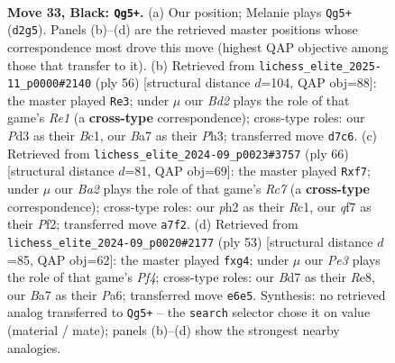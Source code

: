 \documentclass[11pt]{article}
\begin{document}
\clearpage

\begin{figure}[p]\centering
\begin{subfigure}{0.46\textwidth}\centering
\resizebox{\linewidth}{!}{%
\newchessgame
\chessboard[
  setfen={r2r3k/bp1b1Qp1/p3p2P/8/8/BP1p3B/P2q1PKP/1R2R3 b - - 0 33},
  showmover=false,
  pgfstyle=straightmove, color=movearrow, markmove={d2-g5}
]}
\caption{}
\end{subfigure}\hfill
\begin{subfigure}{0.46\textwidth}\centering
\resizebox{\linewidth}{!}{%
\newchessgame
\chessboard[
  setfen={6rk/p5rp/2p4Q/2pp1R2/P3p1Pb/1P4qP/2P5/2B1RK2 w - - 4 29},
  showmover=false,
  pgfstyle=straightmove, color=movearrow, markmove={e1-e3}
]}
\caption{}
\end{subfigure}
\\[4pt]
\begin{subfigure}{0.46\textwidth}\centering
\resizebox{\linewidth}{!}{%
\newchessgame
\chessboard[
  setfen={3r1rk1/2R2p2/5Qpp/p4b2/1q1Pp3/1P5P/5PP1/1BR3K1 w - - 3 34},
  showmover=false,
  pgfstyle=straightmove, color=movearrow, markmove={c7-f7}
]}
\caption{}
\end{subfigure}\hfill
\begin{subfigure}{0.46\textwidth}\centering
\resizebox{\linewidth}{!}{%
\newchessgame
\chessboard[
  setfen={4rrk1/8/ppQ1p1Pp/4bp2/2P3P1/2qB4/P1P1KP2/3R3R b - - 0 27},
  showmover=false,
  pgfstyle=straightmove, color=movearrow, markmove={f5-g4}
]}
\caption{}
\end{subfigure}
\caption{\textbf{Move 33, Black: \texttt{Qg5+}.} (a) Our position; Melanie plays \texttt{Qg5+} (\texttt{d2g5}). Panels (b)--(d) are the retrieved master positions whose correspondence most drove this move (highest QAP objective among those that transfer to it). (b) Retrieved from \texttt{lichess\_elite\_2025-11\_p0000\#2140} (ply 56) [structural distance $d$=104, QAP obj=88]: the master played \texttt{Re3}; under $\mu$ our \emph{Bd2} plays the role of that game's \emph{Re1} (a \textbf{cross-type} correspondence); cross-type roles: our \emph{P}d3 as their \emph{B}c1, our \emph{B}a7 as their \emph{P}h3; transferred move \texttt{d7c6}. (c) Retrieved from \texttt{lichess\_elite\_2024-09\_p0023\#3757} (ply 66) [structural distance $d$=81, QAP obj=69]: the master played \texttt{Rxf7}; under $\mu$ our \emph{Ba2} plays the role of that game's \emph{Rc7} (a \textbf{cross-type} correspondence); cross-type roles: our \emph{p}h2 as their \emph{R}c1, our \emph{q}f7 as their \emph{P}f2; transferred move \texttt{a7f2}. (d) Retrieved from \texttt{lichess\_elite\_2024-09\_p0020\#2177} (ply 53) [structural distance $d$=85, QAP obj=62]: the master played \texttt{fxg4}; under $\mu$ our \emph{Pe3} plays the role of that game's \emph{Pf4}; cross-type roles: our \emph{B}d7 as their \emph{R}e8, our \emph{B}a7 as their \emph{P}a6; transferred move \texttt{e6e5}. Synthesis: no retrieved analog transferred to \texttt{Qg5+} -- the \texttt{search} selector chose it on value (material / mate); panels (b)--(d) show the strongest nearby analogies.}
\label{fig:thought-m65}
\end{figure}
\end{document}
